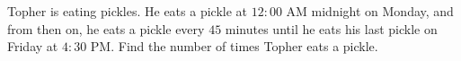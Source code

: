 Topher is eating pickles. He eats a pickle at $12:00$ AM midnight on Monday, and from then on, he eats a pickle every $45$ minutes until he eats his last pickle on Friday at $4:30$ PM. Find the number of times Topher eats a pickle.
